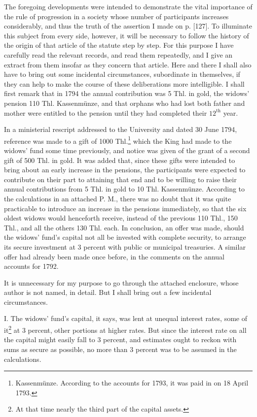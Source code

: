 The foregoing developments were intended to demonstrate the vital importance of the rule of progression in a society whose number of participants increases considerably, and thus the truth of the assertion I made on p. [127]. To illuminate this subject from every side, however, it will be necessary to follow the history of the origin of that article of the statute step by step. For this purpose I have carefully read the relevant records, and read them repeatedly, and I give an extract from them insofar as they concern that article. Here and there I shall also have to bring out some incidental circumstances, subordinate in themselves, if they can help to make the course of these deliberations more intelligible. I shall first remark that in 1794 the annual contribution was 5 Thl. in gold, the widows' pension 110 Thl. Kassenmünze, and that orphans who had lost both father and mother were entitled to the pension until they had completed their \(12^{\text{th}}\) year.

In a ministerial rescript addressed to the University and dated 30 June 1794, reference was made to a gift of 1000 Thl.\footnote{Kassenmünze. According to the accounts for 1793, it was paid in on 18 April 1793.} which the King had made to the widows' fund some time previously, and notice was given of the grant of a second gift of 500 Thl. in gold. It was added that, since these gifts were intended to bring about an early increase in the pensions, the participants were expected to contribute on their part to attaining that end and to be willing to raise their annual contributions from 5 Thl. in gold to 10 Thl. Kassenmünze. According to the calculations in an attached P. M., there was no doubt that it was quite practicable to introduce an increase in the pensions immediately, so that the six oldest widows would henceforth receive, instead of the previous 110 Thl., 150 Thl., and all the others 130 Thl. each. In conclusion, an offer was made, should the widows' fund's capital not all be invested with complete security, to arrange its secure investment at 3 percent with public or municipal treasuries. A similar offer had already been made once before, in the comments on the annual accounts for 1792.

It is unnecessary for my purpose to go through the attached enclosure, whose author is not named, in detail. But I shall bring out a few incidental circumstances.

I. The widows' fund's capital, it says, was lent at unequal interest rates, some of it\footnote{At that time nearly the third part of the capital assets.} at 3 percent, other portions at higher rates. But since the interest rate on all the capital might easily fall to 3 percent, and estimates ought to reckon with sums as secure as possible, no more than 3 percent was to be assumed in the calculations.

